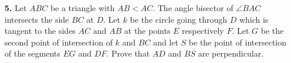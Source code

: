 \documentclass[language=english,style=exam]{smo}
\begin{document}
\begin{enumerate}
\bigskip

\item[\textbf{5.}] 
Let $ABC$ be a triangle with $AB <AC$. The angle bisector of $\angle BAC$ intersects the side $BC$ at $D$. Let $k$ be the circle going through $D$ which is tangent to the sides $AC$ and $AB$ at the points $E$ respectively $F$. Let $G$ be the second point of intersection of $k$ and $BC$ and let $S$ be the point of intersection of the segments $EG$ and $DF$. Prove that $AD$ and $BS$ are perpendicular.
\bigskip

\end{enumerate}

\vspace{1cm}

\end{document}
